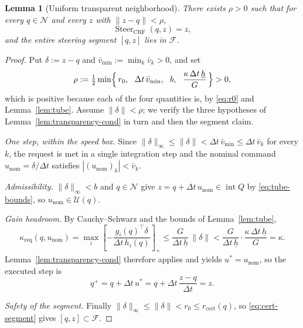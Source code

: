 \documentclass[11pt]{article}
\newtheorem{lemma}{Lemma}
\theoremstyle{remark}
\newcommand{\F}{\mathcal{F}}
\newcommand{\Nb}{\mathcal{N}}
\newcommand{\U}{\mathcal{U}}
\newcommand{\Steer}{\operatorname{Steer}_{\mathrm{CBF}}}
\newcommand{\interior}{\operatorname{int}}
\newcommand{\pospart}[1]{\left[#1\right]_{+}}
\newcommand{\rcert}{r_{\mathrm{cert}}}
\newcommand{\kreq}{\kappa_{\mathrm{req}}}
\newcommand{\unom}{u_{\mathrm{nom}}}
\begin{document}
\begin{lemma}[Uniform transparent neighborhood]
\label{lem:transparency}
There exists $\rho>0$ such that for every $q\in\Nb$ and every $z$ with $\|z-q\|<\rho$,
\begin{equation}
\Steer(q,z)=z,
\label{eq:transparent}
\end{equation}
and the entire steering segment $[q,z]$ lies in $\F$.
\end{lemma}

\begin{proof}
Put $\delta:=z-q$ and $\bar v_{\min}:=\min_k\bar v_k>0$, and set
\begin{equation}
\rho:=\tfrac12\min\Bigl\{\,r_0,\ \ \Delta t\,\bar v_{\min},\ \ b,\ \
\frac{\kappa\,\Delta t\,\underline h}{G}\,\Bigr\}>0,
\label{eq:rho}
\end{equation}
which is positive because each of the four quantities is, by \eqref{eq:r0} and
Lemma~\ref{lem:tube}. Assume $\|\delta\|<\rho$; we verify the three hypotheses of
Lemma~\ref{lem:transparency-cond} in turn and then the segment claim.

\emph{One step, within the speed box.} Since $\|\delta\|_\infty\le\|\delta\|<\Delta t\,\bar
v_{\min}\le\Delta t\,\bar v_k$ for every $k$, the request is met in a single integration
step and the nominal command $\unom=\delta/\Delta t$ satisfies $|(\unom)_k|<\bar v_k$.

\emph{Admissibility.} $\|\delta\|_\infty<b$ and $q\in\Nb$ give
$z=q+\Delta t\,\unom\in\interior Q$ by \eqref{eq:tube-bounds}, so $\unom\in\U(q)$.

\emph{Gain headroom.} By Cauchy--Schwarz and the bounds of Lemma~\ref{lem:tube},
\begin{equation}
\kreq(q,\unom)
=\max_i\pospart{-\frac{g_i(q)^\top\delta}{\Delta t\,h_i(q)}}
\le\frac{G}{\Delta t\,\underline h}\,\|\delta\|
<\frac{G}{\Delta t\,\underline h}\cdot\frac{\kappa\,\Delta t\,\underline h}{G}
=\kappa .
\label{eq:kreq-bound}
\end{equation}
Lemma~\ref{lem:transparency-cond} therefore applies and yields $u^\ast=\unom$, so the
executed step is
\[
q^+=q+\Delta t\,u^\ast=q+\Delta t\,\frac{z-q}{\Delta t}=z .
\]

\emph{Safety of the segment.} Finally $\|\delta\|_\infty\le\|\delta\|<r_0\le\rcert(q)$, so
\eqref{eq:cert-segment} gives $[q,z]\subset\F$.
\end{proof}
\end{document}
